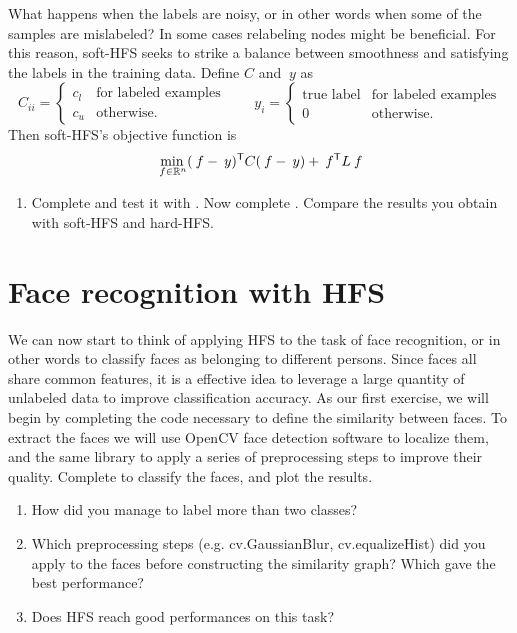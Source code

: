 \documentclass{article}
\begin{document}
	
	What happens when the labels are noisy, or in other words when
	some of the samples are mislabeled? In some cases relabeling nodes might be
	beneficial. For this reason, soft-HFS
	seeks to strike a balance between smoothness and satisfying the labels in
	the training data.
	Define $C$ and $\:y$ as
	$$
	C_{ii} =
	\begin{cases}
	c_l & \mbox{for labeled examples}  \\
	c_u & \mbox{otherwise}. \end{cases}
	\quad\quad
	y_i =
	\begin{cases}
	\mbox{true label} & \mbox{for  labeled examples}  \\
	0 & \mbox{otherwise}. \end{cases}
	$$
	Then soft-HFS's objective function is
	\begin{equation*}
		\min_{\:f \in \mathbb{R}^n}  (\:f - \:y)^{\mathsf{T}} C (\:f - \:y) + \:f^{\mathsf{T}} L \:f
	\end{equation*}
	
	\begin{enumerate}[resume]
		\item Complete  and test it with .
		Now complete . Compare the results you
		obtain with soft-HFS and hard-HFS.
	\end{enumerate}
	
	\section{Face recognition with HFS}
	We can now start to think of applying HFS to the task of face recognition,
	or in other words to classify faces as belonging to different persons. Since
	faces all share common features, it is a effective idea to leverage a large quantity
	of unlabeled data to improve classification accuracy.
	As our first exercise, we will begin by completing the code necessary
	to define the similarity between faces. To extract the faces we will use
	OpenCV face detection software to localize them, and the same library
	to apply a series of preprocessing steps to improve their quality.
	Complete  to classify the faces,
	and plot the results. 
	\begin{enumerate}
		\item How did you manage to label more than two classes?
		\item Which preprocessing steps (e.g. cv.GaussianBlur, cv.equalizeHist)
		did you apply to the faces before
		constructing the similarity graph? Which gave the best performance?
		\item Does HFS reach good performances on this task?
	\end{enumerate}
	
\end{document}
